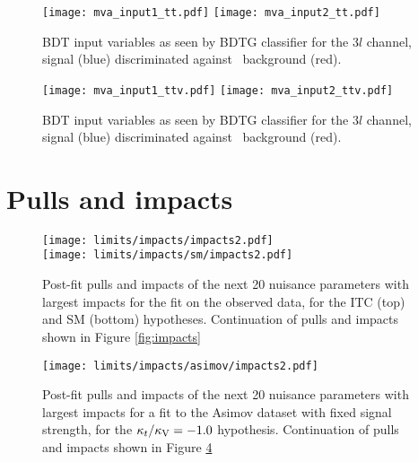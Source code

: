 \begin{figure} [!h]
  \centering
  \texttt{[image: mva\_input1\_tt.pdf]}
  \texttt{[image: mva\_input2\_tt.pdf]}
  \caption[BDT input variables. Discrimination against \ttbar in $3l$ channel.]{BDT input variables as seen by BDTG classifier for the $3l$ channel, \tHq signal (blue) discriminated against \ttbar\ background (red).}
  \label{mva_input_tt}
\end{figure}

\begin{figure} [!h]
  \centering
  \texttt{[image: mva\_input1\_ttv.pdf]}
  \texttt{[image: mva\_input2\_ttv.pdf]}
  \caption[BDT input variables. Discrimination against \ttV\ in $3l$ channel.]{BDT input variables as seen by BDTG classifier for the $3l$ channel, \tHq signal (blue) discriminated against \ttV\ background (red).}
\label{mva_input_ttv}
\end{figure}

\clearpage
\section{Pulls and impacts}\label{pulls_impacts_add}

\begin{figure} [!th]
  \centering
  
  \texttt{[image: limits/impacts/impacts2.pdf]}\\
  \texttt{[image: limits/impacts/sm/impacts2.pdf]}
  \caption[Additional post-fit pulls and impacts.]{Post-fit pulls and impacts of the next 20 nuisance parameters with largest impacts for the fit on the observed data, for the ITC (top) and SM (bottom) hypotheses. Continuation of pulls and impacts shown in Figure \ref{fig:impacts}}
  \label{fig:impacts2}
\end{figure}

  \begin{figure} [!h]
    \centering
    \texttt{[image: limits/impacts/asimov/impacts2.pdf]}\\
    \caption[Additional post-fit pulls an impacts for a fit to the Asimov dataset.]{Post-fit pulls and impacts of the next 20 nuisance parameters with largest impacts for a fit to the Asimov dataset with fixed signal strength, for the $\kappa_t/\kappa_\text{V}=-1.0$ hypothesis. Continuation of pulls and impacts shown in Figure \ref{fig:impacts_asimov2}}
    \label{fig:impacts_asimov2}
  \end{figure}
